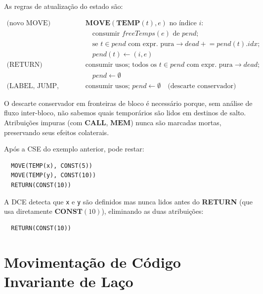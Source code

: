 As regras de atualização do estado são:

\begin{align*}
  \text{(novo MOVE)} &\quad
  \mathbf{MOVE}(\mathbf{TEMP}(t), e) \text{ no índice } i: \\
  &\quad\quad \text{consumir } \mathit{freeTemps}(e) \text{ de }
  \mathit{pend}; \\
  &\quad\quad \text{se } t \in \mathit{pend} \text{ com expr. pura} \to
  \mathit{dead} \mathrel{+}= \mathit{pend}(t).\mathit{idx}; \\
  &\quad\quad \mathit{pend}(t) \leftarrow (i, e) \\[4pt]
  \text{(RETURN)} &\quad
  \text{consumir usos; todos os } t \in \mathit{pend} \text{ com expr.
  pura} \to \mathit{dead}; \\
  &\quad\quad \mathit{pend} \leftarrow \emptyset \\[4pt]
  \text{(LABEL, JUMP, CJUMP)} &\quad
  \text{consumir usos; } \mathit{pend} \leftarrow \emptyset
  \quad \text{(descarte conservador)}
\end{align*}

\begin{remark}
  O descarte conservador em fronteiras de bloco é necessário porque, sem
  análise de fluxo inter-bloco, não sabemos quais temporários são lidos em
  destinos de salto.  Atribuições impuras (com $\mathbf{CALL}$, $\mathbf{MEM}$)
  nunca são marcadas mortas, preservando seus efeitos colaterais.
\end{remark}

\begin{example}
  Após a CSE do exemplo anterior, pode restar:
  \begin{verbatim}
  MOVE(TEMP(x), CONST(5))
  MOVE(TEMP(y), CONST(10))
  RETURN(CONST(10))
  \end{verbatim}
  A DCE detecta que \texttt{x} e \texttt{y} são definidos mas nunca lidos
  antes do \textbf{RETURN} (que usa diretamente $\mathbf{CONST}(10)$),
  eliminando as duas atribuições:
  \begin{verbatim}
  RETURN(CONST(10))
  \end{verbatim}
\end{example}

\section{Movimentação de Código Invariante de Laço}\label{sec:opt-licm}

